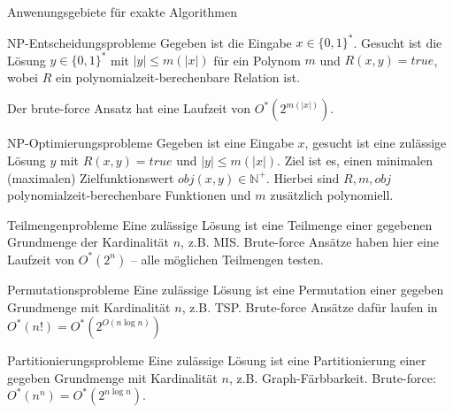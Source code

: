   
\begin{section}{Anwenungsgebiete für exakte Algorithmen}

  \begin{subsection}{NP-Entscheidungsprobleme}
  Gegeben ist die Eingabe $x \in \{0,1\}^*$. Gesucht ist die Lösung $y \in \{0,1\}^*$ mit $|y| \leq m(|x|)$ für ein Polynom $m$ und $R(x,y) = true$, wobei $R$ ein polynomialzeit-berechenbare Relation ist.
  
  Der brute-force Ansatz hat eine Laufzeit von $O^* (2^{m(|x|)})$.
  \end{subsection}

  \begin{subsection}{NP-Optimierungsprobleme}
  Gegeben ist eine Eingabe $x$, gesucht ist eine zulässige Lösung $y$ mit $R(x,y) = true$ und $|y| \leq m(|x|)$. Ziel ist es, einen minimalen (maximalen) Zielfunktionswert $obj(x,y) \in \mathbb{N}^+$. Hierbei sind $R,m, obj$ polynomialzeit-berechenbare Funktionen und $m$ zusätzlich polynomiell.
  \end{subsection}
  
  \begin{subsection}{Teilmengenprobleme}
   Eine zulässige Lösung ist eine Teilmenge einer gegebenen Grundmenge der Kardinalität $n$, z.B. MIS. Brute-force Ansätze haben hier eine Laufzeit von $O^*(2^n)$ -- alle möglichen Teilmengen testen.
  \end{subsection}
  
  \begin{subsection}{Permutationsprobleme}
   Eine zulässige Lösung ist eine Permutation einer gegeben Grundmenge mit Kardinalität $n$, z.B. TSP. Brute-force Ansätze dafür laufen in $O^*(n!) = O^*(2^{O(n\log n)})$
  \end{subsection}
  
  \begin{subsection}{Partitionierungsprobleme}
   Eine zulässige Lösung ist eine Partitionierung einer gegeben Grundmenge mit Kardinalität $n$, z.B. Graph-Färbbarkeit. Brute-force: $O^*(n^n) = O^*(2^{n\log n})$.
  \end{subsection}
  
\end{section}

